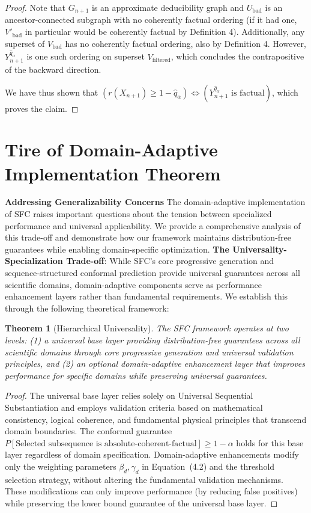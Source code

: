 \documentclass{uai2026} %
\theoremstyle{remark}
\theoremstyle{plain}
\newtheorem{theorem}{Theorem} %
\theoremstyle{definition}
\begin{document}
\begin{proof}
Note that $G_{n+1}$ is an approximate deducibility graph and $U_{\text{bad}}$ is an ancestor-connected subgraph with no coherently factual ordering (if it had one, $V'_{\text{bad}}$ in particular would be coherently factual by Definition 4). Additionally, any superset of $V_{\text{bad}}$ has no coherently factual ordering, also by Definition 4. However, $Y^{\hat{q}_\alpha}_{n+1}$ is one such ordering on superset $V_{\text{filtered}}$, which concludes the contrapositive of the backward direction.

We have thus shown that $(r(X_{n+1}) \geq 1-\hat{q}_\alpha) \Leftrightarrow (Y^{\hat{q}_\alpha}_{n+1} \text{ is factual})$, which proves the claim.
\end{proof}


\section{Tire of Domain-Adaptive Implementation Theorem}
\label{app:domain-adaptive}
\textbf{Addressing Generalizability Concerns}
The domain-adaptive implementation of SFC raises important questions about the tension between specialized performance and universal applicability. We provide a comprehensive analysis of this trade-off and demonstrate how our framework maintains distribution-free guarantees while enabling domain-specific optimization.
\textbf{The Universality-Specialization Trade-off}: While SFC's core progressive generation and sequence-structured conformal prediction provide universal guarantees across all scientific domains, domain-adaptive components serve as performance enhancement layers rather than fundamental requirements. We establish this through the following theoretical framework:
\begin{theorem}[Hierarchical Universality]
\label{thm:hierarchical-universality}
The SFC framework operates at two levels: (1) a universal base layer providing distribution-free guarantees across all scientific domains through core progressive generation and universal validation principles, and (2) an optional domain-adaptive enhancement layer that improves performance for specific domains while preserving universal guarantees.
\end{theorem}
\begin{proof}
The universal base layer relies solely on Universal Sequential Substantiation and employs validation criteria based on mathematical consistency, logical coherence, and fundamental physical principles that transcend domain boundaries. The conformal guarantee $P[\text{Selected subsequence is absolute-coherent-factual}] \geq 1-\alpha$ holds for this base layer regardless of domain specification.
Domain-adaptive enhancements modify only the weighting parameters $\beta_d, \gamma_d$ in Equation~(4.2) and the threshold selection strategy, without altering the fundamental validation mechanisms. These modifications can only improve performance (by reducing false positives) while preserving the lower bound guarantee of the universal base layer.
\end{proof}
\end{document}
